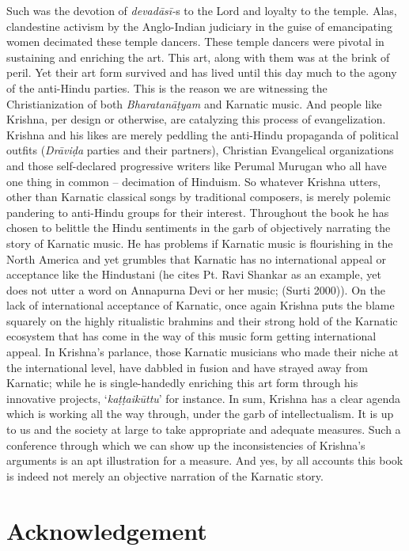 Such was the devotion of \textit{devadāsī-}s to the Lord and loyalty to the temple. Alas, clandestine activism by the Anglo-Indian judiciary in the guise of emancipating women decimated these temple dancers. These temple dancers were pivotal in sustaining and enriching the art. This art, along with them was at the brink of peril. Yet their art form survived and has lived until this day much to the agony of the anti-Hindu parties. This is the reason we are witnessing the Christianization of both \textit{Bharatanāṭyam} and Karnatic music. And people like Krishna, per design or otherwise, are catalyzing this process of evangelization. Krishna and his likes are merely peddling the anti-Hindu propaganda of political outfits (\textit{Drāviḍa} parties and their partners), Christian Evangelical organizations and those self-declared progressive writers like Perumal Murugan who all have one thing in common – decimation of Hinduism. So whatever Krishna utters, other than Karnatic classical songs by traditional composers, is merely polemic pandering to anti-Hindu groups for their interest. Throughout the book he has chosen to belittle the Hindu sentiments in the garb of objectively narrating the story of Karnatic music. He has problems if Karnatic music is flourishing in the North America and yet grumbles that Karnatic has no international appeal or acceptance like the Hindustani (he cites Pt. Ravi Shankar as an example, yet does not utter a word on Annapurna Devi or her music; (Surti 2000)). On the lack of international acceptance of Karnatic, once again Krishna puts the blame squarely on the highly ritualistic brahmins and their strong hold of the Karnatic ecosystem that has come in the way of this music form getting international appeal. In Krishna’s parlance, those Karnatic musicians who made their niche at the international level, have dabbled in fusion and have strayed away from Karnatic; while he is single-handedly enriching this art form through his innovative projects, ‘\textit{kaṭṭaikūttu}’ for instance. In sum, Krishna has a clear agenda which is working all the way through, under the garb of intellectualism. It is up to us and the society at large to take appropriate and adequate measures. Such a conference through which we can show up the inconsistencies of Krishna’s arguments is an apt illustration for a measure. And yes, by all accounts this book is indeed not merely an objective narration of the Karnatic story.


\section*{Acknowledgement}

